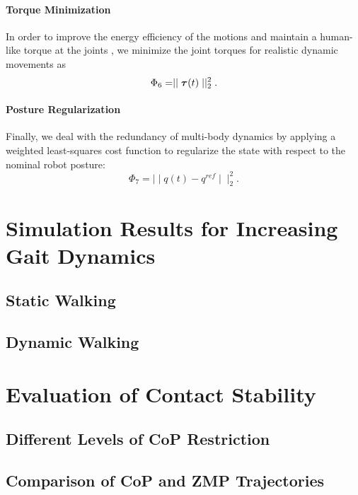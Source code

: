\paragraph{Torque Minimization}
In order to improve the energy efficiency of the motions and maintain a human-like torque at the joints \cite{kim1994modeling}, we minimize the joint torques for realistic dynamic movements as 
\begin{equation*} 
\Phi_6=\mid\mid \bm{\mathit{\tau}}(t)\mid\mid^2_2.
\end{equation*}
\paragraph{Posture Regularization}
Finally, we deal with the redundancy of multi-body dynamics by applying a weighted least-squares cost function to regularize the state with respect to the nominal robot posture:
\begin{equation*} 
\Phi_7=\mid\mid q(t)-q^{ref}\mid\mid^2_2.
\end{equation*}


\section{Simulation Results for Increasing Gait Dynamics}
\subsection{Static Walking}
\subsection{Dynamic Walking}


\section{Evaluation of Contact Stability}
\subsection{Different Levels of CoP Restriction}
\subsection{Comparison of CoP and ZMP Trajectories}



